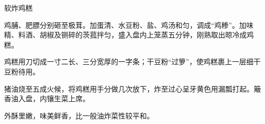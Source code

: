 %
%
%
%
%
%
%
\begin{recipe}{软炸鸡糕}

\ingredients


\preparation

\step 鸡脯、肥膘分别砸至极茸。加蛋清、水豆粉、盐、鸡汤和匀，调成“鸡糁”。加味
精、料酒、胡椒及铡碎的茨菰拌匀，盛入盘内上笼蒸五分钟，刚熟取出晾冷成鸡糕。

\step 鸡糕用刀切成一寸二长、三分宽厚的一字条；干豆粉“过箩”，使鸡糕裹上一层细干
豆粉待用。

\step 猪油烧至五成火候，将鸡糕用手分做几次放下，炸至过心呈牙黄色用漏瓢打起。簸
香油入盘，内镶生菜上席。

\features

外酥里嫩，味美鲜香，比一般油炸菜性较平和。

\end{recipe}

